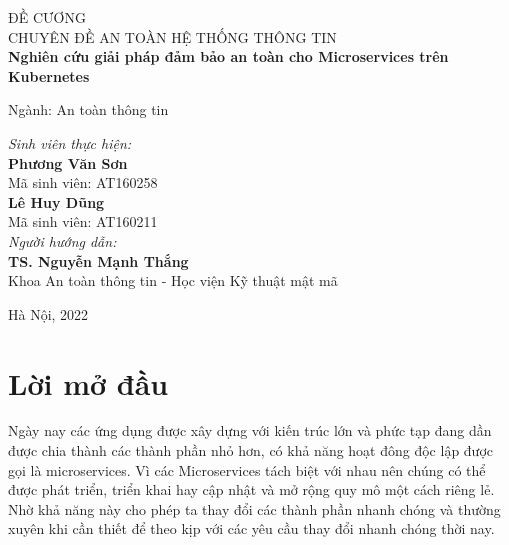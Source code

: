 \documentclass[12pt,a4paper]{report}
\begin{document}
\begin{titlepage}
	
	\begin{center}
		{\Huge ĐỀ CƯƠNG\\}
		{\large CHUYÊN ĐỀ AN TOÀN HỆ THỐNG THÔNG TIN\\}
		\textbf{Nghiên cứu giải pháp đảm bảo an toàn cho Microservices trên Kubernetes}
	\end{center}
	\bigskip
	\begin{flushright}
		\large{Ngành: An toàn thông tin}
	\end{flushright}
	\vspace{30mm}
	\begin{flushleft}
		\textit{Sinh viên thực hiện:}\\
		\textbf{Phương Văn Sơn}\\
		Mã sinh viên: AT160258\\
		\textbf{Lê Huy Dũng}\\
		Mã sinh viên: AT160211
		\bigskip\\
		\textit{Người hướng dẫn:}\\
		\textbf{TS. Nguyễn Mạnh Thắng}\\
		Khoa An toàn thông tin - Học viện Kỹ thuật mật mã
	\end{flushleft}
	\vfill
	\begin{center}
		Hà Nội, 2022
	\end{center}
	
\end{titlepage}
	
\chapter*{\centering Lời mở đầu}
\setcounter{page}{2}
\hspace{0.6cm}{Nhiều năm trước, hầu hết các ứng dụng phần mềm đều được xây dựng với kiến trúc monolith hay còn gọi là kiến trúc 1 khối là mẫu thiết kế được dùng nhiều nhất trong giới lập trình web hiện nay bởi tính đơn giản của nó khi phát triển và khi triển khai. Các ứng dụng này chạy dưới dạng một tiến trình đơn lẻ hoặc số lượng nhỏ các tiến trình trên một số ít máy chủ. Chúng có khả năng cập nhật và nâng cấp chậm và yêu cầu nâng cấp thường xuyên. Trong trường hợp có sự cố như lỗi phần cứng hệ thống phần mềm này sẽ phải được di chuyển một cách thủ công sang các máy chủ còn hoạt động tốt.\\}

Ngày nay các ứng dụng được xây dựng với kiến trúc lớn và phức tạp đang dần được chia thành các thành phần nhỏ hơn, có khả năng hoạt đông độc lập được gọi là microservices. Vì các Microservices tách biệt với nhau nên chúng có thể được phát triển, triển khai hay cập nhật và mở rộng quy mô một cách riêng lẻ. Nhờ khả năng này cho phép ta thay đổi các thành phần nhanh chóng và thường xuyên khi cần thiết để theo kịp với các yêu cầu thay đổi nhanh chóng thời nay.\\
\end{document}
